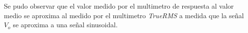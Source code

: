 


Se pudo observar que el valor medido por el multimetro de respuesta al valor medio se aproxima al medido por el multimetro \textit{TrueRMS} a medida que la señal $V_o$ se aproxima a una señal sinusoidal. 


\begin{figure}[H]
    \centering
    
    
    \label{fig:vivo}
\end{figure}


\begin{figure}[H]
    \centering
    
\end{figure}

